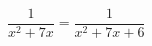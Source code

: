 \begin{ex}[type=equation]
	\begin{condition}
		$\dfrac{1}{x^2 + 7x} = \dfrac{1}{x^2 + 7x +6}$
	\end{condition}
	\answer{$\varnothing$}
\end{ex}